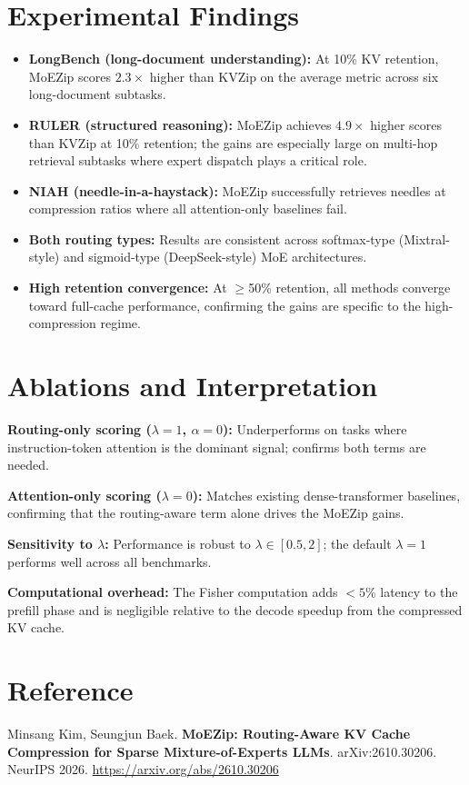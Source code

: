 \documentclass[10pt,twocolumn]{article}
\begin{document}
\section{Experimental Findings}

\begin{itemize}[itemsep=2pt,parsep=0pt]
  \item \textbf{LongBench (long-document understanding):} At 10\% KV retention,
    MoEZip scores $2.3\times$ higher than KVZip on the average metric across
    six long-document subtasks.
  \item \textbf{RULER (structured reasoning):} MoEZip achieves $4.9\times$ higher
    scores than KVZip at 10\% retention; the gains are especially large on
    multi-hop retrieval subtasks where expert dispatch plays a critical role.
  \item \textbf{NIAH (needle-in-a-haystack):} MoEZip successfully retrieves
    needles at compression ratios where all attention-only baselines fail.
  \item \textbf{Both routing types:} Results are consistent across softmax-type
    (Mixtral-style) and sigmoid-type (DeepSeek-style) MoE architectures.
  \item \textbf{High retention convergence:} At $\geq$50\% retention, all methods
    converge toward full-cache performance, confirming the gains are specific to
    the high-compression regime.
\end{itemize}

\section{Ablations and Interpretation}

\textbf{Routing-only scoring ($\lambda=1$, $\alpha=0$):}
Underperforms on tasks where instruction-token attention is the dominant signal;
confirms both terms are needed.

\textbf{Attention-only scoring ($\lambda=0$):}
Matches existing dense-transformer baselines, confirming that the routing-aware
term alone drives the MoEZip gains.

\textbf{Sensitivity to $\lambda$:}
Performance is robust to $\lambda \in [0.5, 2]$; the default $\lambda = 1$
performs well across all benchmarks.

\textbf{Computational overhead:}
The Fisher computation adds $< 5\%$ latency to the prefill phase and is negligible
relative to the decode speedup from the compressed KV cache.

\section*{Reference}

Minsang Kim, Seungjun Baek.
\textbf{MoEZip: Routing-Aware KV Cache Compression for Sparse
Mixture-of-Experts LLMs}.
arXiv:2610.30206. NeurIPS 2026.
\url{https://arxiv.org/abs/2610.30206}
\end{document}
